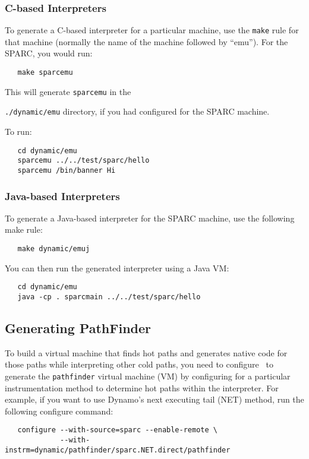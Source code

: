 \subsubsection{C-based Interpreters} 
To generate a C-based interpreter for a particular machine, use the 
\texttt{make} rule for that machine
(normally the name of the machine followed by ``emu''). 
For the SPARC, you would run: 
\begin{verbatim}
   make sparcemu
\end{verbatim}
This will generate \texttt{sparcemu} in the {\texttt{./dynamic/emu} 
directory, if you had configured for the SPARC machine.

To run: 
\begin{verbatim}
   cd dynamic/emu
   sparcemu ../../test/sparc/hello 
   sparcemu /bin/banner Hi
\end{verbatim}


\subsubsection{Java-based Interpreters}
To generate a Java-based interpreter for the SPARC machine, use 
the following make rule: 
\begin{verbatim}
   make dynamic/emuj
\end{verbatim}

You can then run the generated interpreter using a Java VM: 
\begin{verbatim}
   cd dynamic/emu
   java -cp . sparcmain ../../test/sparc/hello
\end{verbatim}


\subsection{Generating PathFinder}

To build a virtual machine that finds hot paths and generates 
native code for those paths while interpreting other cold 
paths, you need to configure \walk\ to generate the \texttt{pathfinder} 
virtual machine (VM)
by configuring for a particular instrumentation method to determine
hot paths within the interpreter.  For example, if you want to use   
Dynamo's next executing tail (NET) method, run the following
configure command: 

\begin{verbatim}
   configure --with-source=sparc --enable-remote \ 
             --with-instrm=dynamic/pathfinder/sparc.NET.direct/pathfinder 
\end{verbatim}

}
